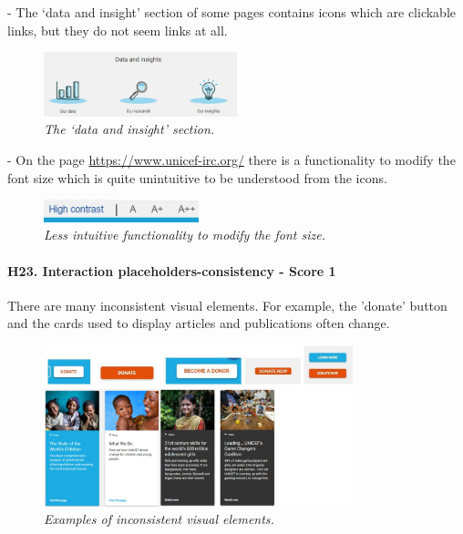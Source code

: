 \newline -	The ‘data and insight’ section of some pages contains icons which are clickable links, but they do not seem links at all.
\begin{figure}[!h]
	\begin{center}
		\includegraphics[width=0.5\textwidth]{FinalScores25.jpg}
		\captionsetup{font=small}
		\caption{\textit{The ‘data and insight’ section.}}
	\end{center}
\end{figure}
\newline -	On the page \href{https://www.unicef-irc.org/}{https://www.unicef-irc.org/} there is a functionality to modify the font size which is quite unintuitive to be understood from the icons.
\begin{figure}[!h]
	\begin{center}
		\includegraphics[width=0.4\textwidth]{FinalScores26.jpg}
		\captionsetup{font=small}
		\caption{\textit{Less intuitive functionality to modify the font size.}}
	\end{center}
\end{figure}
\newline
\newline \paragraph{H23. Interaction placeholders-consistency - Score 1}  \label{subsec:H23}	There are many inconsistent visual elements. For example, the 'donate' button and the cards used to display articles and publications often change.
\begin{figure}[!h]
	\begin{center}
		\includegraphics[width=0.8\textwidth]{FinalScores27.jpg}
		\captionsetup{font=small}
		\caption{\textit{Examples of inconsistent visual elements.}}
	\end{center}
\end{figure}
